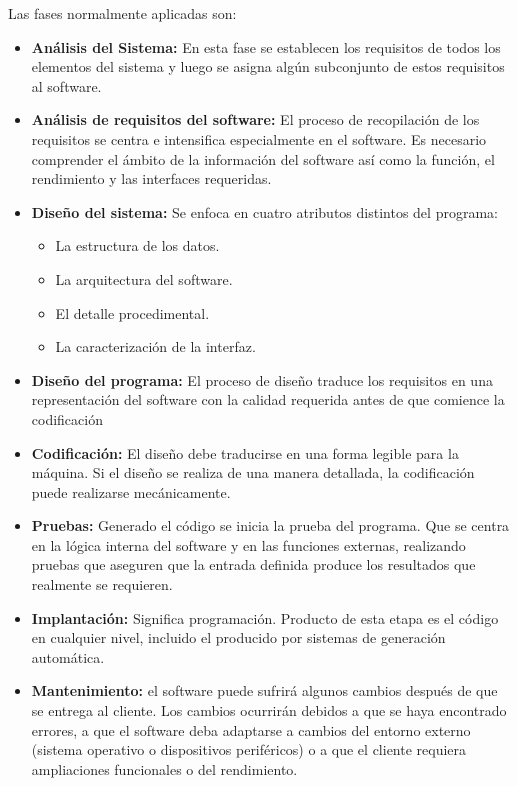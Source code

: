	Las fases normalmente aplicadas son:
	\begin{itemize}
		\item \textbf{An\'alisis del Sistema:} En esta fase se establecen los requisitos de todos los elementos del sistema y luego se asigna alg\'un subconjunto de estos requisitos al software.
		\item \textbf{An\'alisis de requisitos del software:} El proceso de recopilaci\'on de los requisitos se centra e intensifica especialmente en el software. Es necesario comprender el \'ambito de la informaci\'on del software as\'i como la funci\'on, el rendimiento y las interfaces requeridas.
		\item \textbf{Dise\~no del sistema:} Se enfoca en cuatro atributos distintos del programa: 
			\begin{itemize}
				\item La estructura de los datos.
				\item La arquitectura del software.
				\item El detalle procedimental.
				\item La caracterizaci\'on de la interfaz. 
			\end{itemize}
		\item \textbf{Dise\~no del programa:} El proceso de dise\~no traduce los requisitos en una representaci\'on del software con la calidad requerida antes de que comience la codificaci\'on
		\item \textbf{Codificaci\'on:} El dise\~no debe traducirse en una forma legible para la m\'aquina. Si el dise\~no se realiza de una manera detallada, la codificaci\'on puede realizarse mec\'anicamente.
		\item \textbf{Pruebas:} Generado el c\'odigo se inicia la prueba del programa. Que se centra en la l\'ogica interna del software y en las funciones externas, realizando pruebas que aseguren que la entrada definida produce los resultados que realmente se requieren.
		\item \textbf{Implantaci\'on:} Significa programaci\'on. Producto de esta etapa es el c\'odigo en cualquier nivel, incluido el producido por sistemas de generaci\'on autom\'atica.
		\item \textbf{Mantenimiento:} el software  puede sufrir\'a algunos cambios despu\'es de que se entrega al cliente. Los cambios ocurrir\'an debidos a que se haya encontrado errores, a que el software deba adaptarse a cambios del entorno externo (sistema operativo o dispositivos perif\'ericos) o a que el cliente requiera ampliaciones funcionales o del rendimiento.
	\end{itemize}


